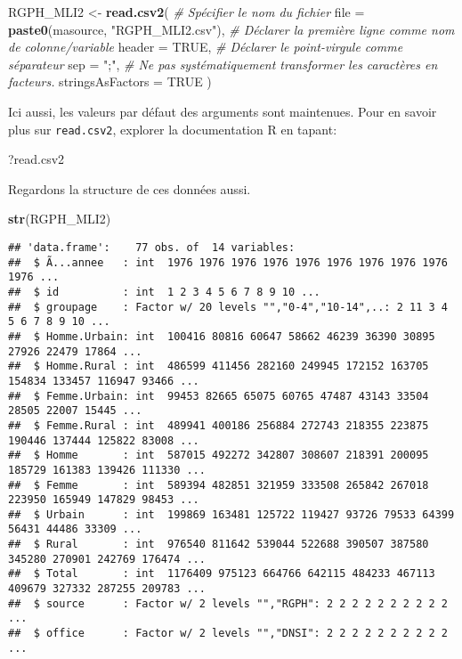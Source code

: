 \documentclass[]{book}
\newenvironment{Shaded}{\begin{snugshade}}{\end{snugshade}}
\newcommand{\KeywordTok}[1]{\textcolor[rgb]{0.13,0.29,0.53}{\textbf{#1}}}
\newcommand{\DataTypeTok}[1]{\textcolor[rgb]{0.13,0.29,0.53}{#1}}
\newcommand{\StringTok}[1]{\textcolor[rgb]{0.31,0.60,0.02}{#1}}
\newcommand{\CommentTok}[1]{\textcolor[rgb]{0.56,0.35,0.01}{\textit{#1}}}
\newcommand{\OtherTok}[1]{\textcolor[rgb]{0.56,0.35,0.01}{#1}}
\newcommand{\NormalTok}[1]{#1}
\begin{document}
\begin{Shaded}
\begin{Highlighting}[]
\NormalTok{RGPH_MLI2 <-}\StringTok{ }\KeywordTok{read.csv2}\NormalTok{(}
  \CommentTok{# Spécifier le nom du fichier}
  \DataTypeTok{file =} \KeywordTok{paste0}\NormalTok{(masource, }\StringTok{"RGPH_MLI2.csv"}\NormalTok{), }
  \CommentTok{# Déclarer la première ligne comme nom de colonne/variable}
  \DataTypeTok{header =} \OtherTok{TRUE}\NormalTok{, }
  \CommentTok{# Déclarer le point-virgule comme séparateur}
  \DataTypeTok{sep =} \StringTok{";"}\NormalTok{, }
  \CommentTok{# Ne pas systématiquement transformer les caractères en facteurs.}
  \DataTypeTok{stringsAsFactors =} \OtherTok{TRUE} 
\NormalTok{)}
\end{Highlighting}
\end{Shaded}

Ici aussi, les valeurs par défaut des arguments sont maintenues. Pour en
savoir plus sur \texttt{read.csv2}, explorer la documentation R en
tapant:

\begin{Shaded}
\begin{Highlighting}[]
\NormalTok{?read.csv2}
\end{Highlighting}
\end{Shaded}

Regardons la structure de ces données aussi.

\begin{Shaded}
\begin{Highlighting}[]
\KeywordTok{str}\NormalTok{(RGPH_MLI2)}
\end{Highlighting}
\end{Shaded}

\begin{verbatim}
## 'data.frame':    77 obs. of  14 variables:
##  $ Ã...annee   : int  1976 1976 1976 1976 1976 1976 1976 1976 1976 1976 ...
##  $ id          : int  1 2 3 4 5 6 7 8 9 10 ...
##  $ groupage    : Factor w/ 20 levels "","0-4","10-14",..: 2 11 3 4 5 6 7 8 9 10 ...
##  $ Homme.Urbain: int  100416 80816 60647 58662 46239 36390 30895 27926 22479 17864 ...
##  $ Homme.Rural : int  486599 411456 282160 249945 172152 163705 154834 133457 116947 93466 ...
##  $ Femme.Urbain: int  99453 82665 65075 60765 47487 43143 33504 28505 22007 15445 ...
##  $ Femme.Rural : int  489941 400186 256884 272743 218355 223875 190446 137444 125822 83008 ...
##  $ Homme       : int  587015 492272 342807 308607 218391 200095 185729 161383 139426 111330 ...
##  $ Femme       : int  589394 482851 321959 333508 265842 267018 223950 165949 147829 98453 ...
##  $ Urbain      : int  199869 163481 125722 119427 93726 79533 64399 56431 44486 33309 ...
##  $ Rural       : int  976540 811642 539044 522688 390507 387580 345280 270901 242769 176474 ...
##  $ Total       : int  1176409 975123 664766 642115 484233 467113 409679 327332 287255 209783 ...
##  $ source      : Factor w/ 2 levels "","RGPH": 2 2 2 2 2 2 2 2 2 2 ...
##  $ office      : Factor w/ 2 levels "","DNSI": 2 2 2 2 2 2 2 2 2 2 ...
\end{verbatim}
\end{document}
